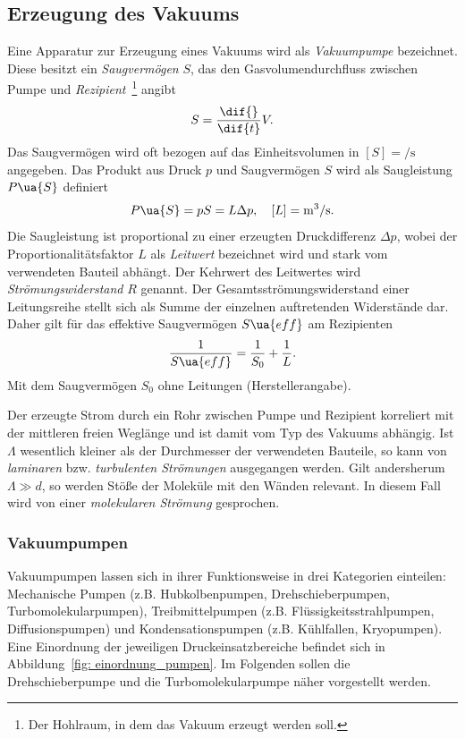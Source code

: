 \subsection{Erzeugung des Vakuums}
Eine Apparatur zur Erzeugung eines Vakuums wird als \emph{Vakuumpumpe} bezeichnet. Diese besitzt ein
\emph{Saugvermögen} $S$, das den Gasvolumendurchfluss zwischen Pumpe und
\emph{Rezipient}~\footnote{Der Hohlraum, in dem das Vakuum erzeugt werden soll.}
angibt
\begin{equation}
  S = \frac{\dif{}}{\dif{t}} V.
\end{equation}
Das Saugvermögen wird oft bezogen auf das Einheitsvolumen in $[{S}] = \si{\per \second}$ angegeben. %
Das Produkt aus Druck $p$ und Saugvermögen $S$ wird als Saugleistung $P\ua{S}$ definiert
\begin{equation}
  P\ua{S} = p S = L \Delta p , \quad [L] = \si{\meter^3 \per \second}.
\end{equation}
Die Saugleistung ist proportional zu einer erzeugten Druckdifferenz $\Delta p$,
wobei der Proportionalitätsfaktor $L$ als \emph{Leitwert} bezeichnet wird und stark vom verwendeten Bauteil abhängt.
Der Kehrwert des Leitwertes wird \emph{Strömungswiderstand} $R$ genannt. Der Gesamtsströmungswiderstand einer Leitungsreihe
stellt sich als Summe der einzelnen auftretenden Widerstände dar.
Daher gilt für das effektive Saugvermögen $S\ua{eff}$ am Rezipienten
\begin{equation}
 \frac{1}{S\ua{eff}} = \frac{1}{S_0} + \frac{1}{L}.
 \label{eq: effektives_saugvermögen}
\end{equation}
Mit dem Saugvermögen $S_0$ ohne Leitungen (Herstellerangabe).

Der erzeugte Strom durch ein Rohr zwischen Pumpe und Rezipient korreliert mit der mittleren freien Weglänge
und ist damit vom Typ des Vakuums abhängig. Ist $\Lambda$ wesentlich
kleiner als der Durchmesser der verwendeten Bauteile, so kann von \emph{laminaren} bzw. \emph{turbulenten Strömungen}
ausgegangen werden. Gilt andersherum
$\Lambda \gg d$, so werden Stöße der Moleküle mit den Wänden relevant.
In diesem Fall wird von einer \emph{molekularen Strömung} gesprochen.

\subsubsection{Vakuumpumpen}
Vakuumpumpen lassen sich in ihrer Funktionsweise in drei Kategorien einteilen: Mechanische Pumpen (z.B. Hubkolbenpumpen,
Drehschieberpumpen, Turbomolekularpumpen), Treibmittelpumpen (z.B. Flüssigkeitsstrahlpumpen, Diffusionspumpen) und
Kondensationspumpen (z.B. Kühlfallen, Kryopumpen). Eine Einordnung der jeweiligen Druckeinsatzbereiche befindet sich in
Abbildung~\ref{fig: einordnung_pumpen}. Im Folgenden sollen die Drehschieberpumpe und die Turbomolekularpumpe
näher vorgestellt werden.

